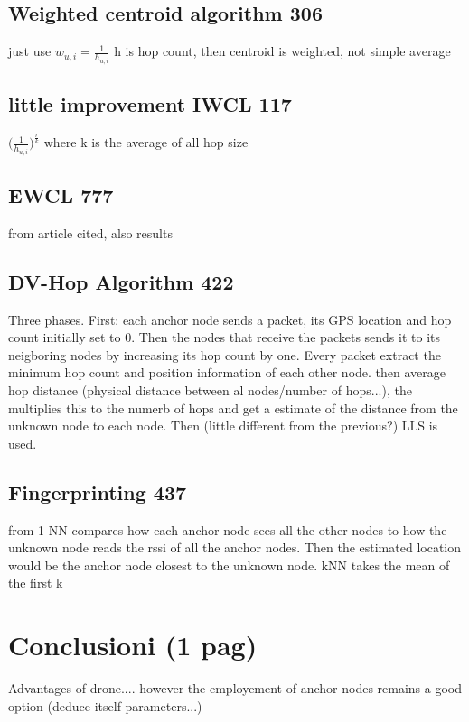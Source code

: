 \documentclass[12pt,twoside]{report}
\begin{document}
\section{Weighted centroid algorithm 306}
just use $w_{u,i}=\frac{1}{h_{u,i}}$ h is hop count, then centroid is weighted, not simple average


\section{little improvement IWCL 117}
$\bigg(\frac{1}{h_{u,i}}\bigg)^{\frac{r}{k}}$
where k is the average of all hop size


\section{EWCL 777}
from article cited, also results
\clearpage

\section{DV-Hop Algorithm 422}
Three phases. First: each anchor node sends a packet, its GPS location and hop count initially set to 0. Then the nodes that receive the packets sends it to its neigboring nodes by increasing its hop count by one. Every packet extract the minimum hop count and position information of each other node. then average hop distance (physical distance between al nodes/number of hops...), the multiplies this to the numerb of hops and get a estimate of the distance from the unknown node to each node. Then (little different from the previous?) LLS is used.
\clearpage


\section{Fingerprinting 437}
from \cite{YIU2017235} 1-NN compares how each anchor node sees all the other nodes to how the unknown node reads the rssi of all the anchor nodes. Then the estimated location would be the anchor node closest to the unknown node. kNN takes the mean of the first k 






\chapter{Conclusioni (1 pag)}
Advantages of drone.... however the employement of anchor nodes remains a good option (deduce itself parameters...)








\clearpage
\printbibliography[
heading=bibintoc,
title={Whole bibliography}
]

\clearpage

\printbibliography[heading=subbibintoc,type=article,title={Articles only}]
\end{document}

